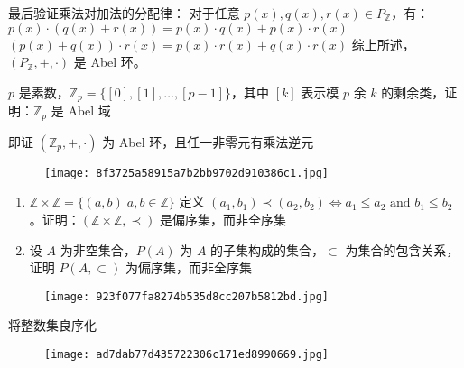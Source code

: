 最后验证乘法对加法的分配律：
对于任意 $p(x), q(x), r(x) \in P_{\mathbb{Z}}$，有：
$p(x) \cdot (q(x) + r(x)) = p(x) \cdot q(x) + p(x) \cdot r(x)$
$(p(x) + q(x)) \cdot r(x) = p(x) \cdot r(x) + q(x) \cdot r(x)$
综上所述，$(P_{\mathbb{Z}},+,\cdot)$ 是 Abel 环。

\begin{exercise}
$p$ 是素数，$\mathbb{Z}_{p}=\{ [0],[1],\dots,[p-1] \}$，其中 $[k]$ 表示模 $p$ 余 $k$ 的剩余类，证明：$\mathbb{Z}_{p}$ 是 Abel 域
\end{exercise}
即证 $(\mathbb{Z}_{p},+,\cdot)$ 为 Abel 环，且任一非零元有乘法逆元
\begin{figure}[H]
\centering
\texttt{[image: 8f3725a58915a7b2bb9702d910386c1.jpg]}
\label{}
\end{figure}

\begin{exercise}
\begin{enumerate}
		\item $\mathbb{Z}\times \mathbb{Z}=\{ (a,b)|a,b\in \mathbb{Z} \}$ 定义 $(a_{1}, b_{1})\prec (a_{2},b_{2})\iff a_{1}\leq a_{2}\text{ and }b_{1}\leq b_{2}$。证明：$(\mathbb{Z}\times \mathbb{Z},\prec)$ 是偏序集，而非全序集
		\item 设 $A$ 为非空集合，$P(A)$ 为 $A$ 的子集构成的集合，$\subset$ 为集合的包含关系，证明 $P(A,\subset)$ 为偏序集，而非全序集
	\end{enumerate}
\end{exercise}
\begin{figure}[H]
\centering
\texttt{[image: 923f077fa8274b535d8cc207b5812bd.jpg]}
\label{}
\end{figure}

\begin{exercise}
将整数集良序化
\end{exercise}
\begin{figure}[H]
\centering
\texttt{[image: ad7dab77d435722306c171ed8990669.jpg]}
\label{}
\end{figure}
